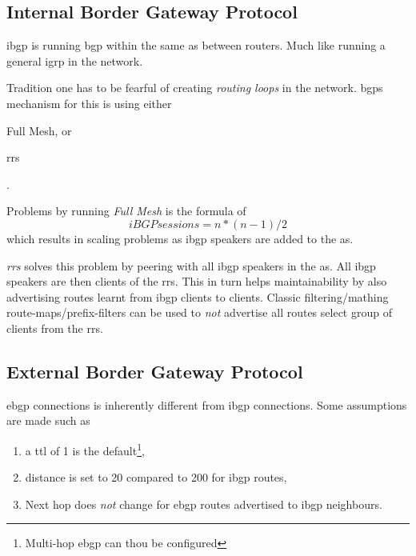 \subsection[iBGP]{Internal Border Gateway Protocol}

\gls{ibgp} is running \gls{bgp} within the same \gls{as} between routers. Much like running a general \gls{igrp} in the network.

Tradition one has to be fearful of creating \textit{routing loops} in the network. \glspl{bgp} mechanism for this is using either \begin{mylist} \item Full Mesh, or \item \glspl{rr} \end{mylist}.

Problems by running \textit{Full Mesh} is the formula of \[ iBGPsessions = n*(n-1)/2 \]  which results in scaling problems as \gls{ibgp} speakers are added to the \gls{as}.

\textit{\glspl{rr}} solves this problem by peering with all \gls{ibgp} speakers in the \gls{as}. All \gls{ibgp} speakers are then clients of the \glspl{rr}. This in turn helps maintainability by also advertising routes learnt from \gls{ibgp} clients to clients. Classic filtering/mathing route-maps/prefix-filters can be used to \textit{not} advertise all routes select group of clients from the \glspl{rr}.

\subsection[eBGP]{External Border Gateway Protocol}

\gls{ebgp} connections is inherently different from \gls{ibgp} connections. Some assumptions are made such as
\begin{enumerate}
    \item a \gls{ttl} of 1 is the default\footnote{Multi-hop \gls{ebgp} can thou be configured},
    \item distance is set to 20 compared to 200 for \gls{ibgp} routes,
    \item Next hop does \textit{not} change for \gls{ebgp} routes advertised to \gls{ibgp} neighbours.
\end{enumerate}